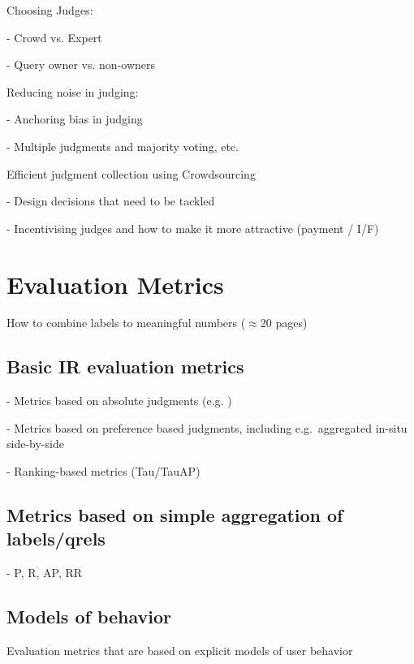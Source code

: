 \documentclass[openany]{now} %
\newcommand{\newpar}{\bigskip\noindent}
\begin{document}
Choosing Judges: 

- Crowd vs. Expert \cite{Kazai:2013} \cite{Alonso20121053}

- Query owner vs. non-owners \cite{Chouldechova:2013}

\newpar
Reducing noise in judging: 

- Anchoring bias in judging \cite{Shokouhi:2015}

- Multiple judgments and majority voting, etc. \cite{Venanzi:2014}

\newpar
Efficient judgment collection using Crowdsourcing

-	Design decisions that need to be tackled  \cite{Blanco:2011} \cite{Kazai2012} \cite{Alonso2012} \cite{Alonso:2015} \cite{Scholer:2013} 

-	Incentivising judges and how to make it more attractive (payment / I/F)
\cite{Megorskaya2015} \cite{Davtyan2015}  \cite{Rokicki:2014}  \cite{Eickhoff:2012}

\chapter{Evaluation Metrics}
\label{c-metrics}

How to combine labels to meaningful numbers (\ensuremath{\approx}20 pages)

\section{Basic IR evaluation metrics}

- Metrics based on absolute judgments (e.g. \cite{cooper73selecting})

- Metrics based on preference based judgments, including e.g.\ aggregated in-situ side-by-side \cite{Thomas2006}

- Ranking-based metrics (Tau/TauAP)

\section{Metrics based on simple aggregation of labels/qrels}

- P, R, AP, RR

\section{Models of behavior}

Evaluation metrics that are based on explicit models of user behavior
\end{document}
